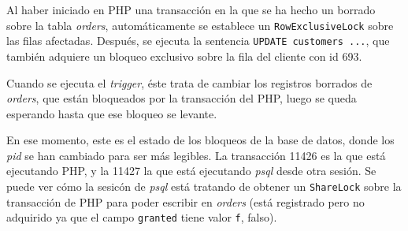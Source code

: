 \documentclass{article}
\begin{document}
Al haber iniciado en PHP una transacción en la que se ha hecho un borrado sobre la tabla \textit{orders}, automáticamente se establece un \texttt{RowExclusiveLock} sobre las filas afectadas. Después, se ejecuta la sentencia \texttt{UPDATE customers ...}, que también adquiere un bloqueo exclusivo sobre la fila del cliente con id 693.

Cuando se ejecuta el \textit{trigger}, éste trata de cambiar los registros borrados de \textit{orders}, que están bloqueados por la transacción del PHP, luego se queda esperando hasta que ese bloqueo se levante.

En ese momento, este es el estado de los bloqueos de la base de datos, donde los \textit{pid} se han cambiado para ser más legibles. La transacción 11426 es la que está ejecutando PHP, y la 11427 la que está ejecutando \textit{psql} desde otra sesión. Se puede ver cómo la sesicón de \textit{psql} está tratando de obtener un \texttt{ShareLock} sobre la transacción de PHP para poder escribir en \textit{orders} (está registrado pero no adquirido ya que el campo \texttt{granted} tiene valor \texttt{f}, falso).
\end{document}
